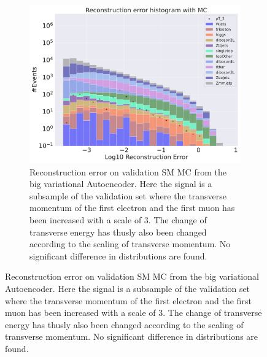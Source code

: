 \begin{figure}[h!]
\begin{subfigure}{.45\textwidth}
        \includegraphics[width=\textwidth]{Figures/AE_testing/big/b_data_recon_big_rm3_feats_sig_pT_3.pdf}
        \caption{Reconstruction error on validation SM MC from the big variational Autoencoder. Here the signal is a subsample of the validation 
        set where the transverse momentum of the first electron and the first muon has been increased with a scale of $3$. The change of transverse 
        energy has thusly also been changed according to the scaling of transverse momentum. No significant difference in distributions are found. }
        \label{fig:ae_big_pt_3}
    \end{subfigure}
    \hfill 
    \label{fig:ae_big_small_pt_3}
\end{figure}

